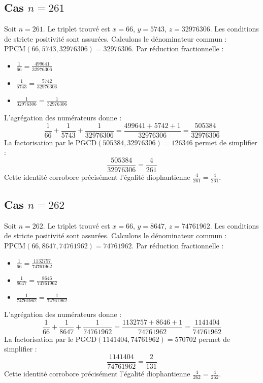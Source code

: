 \documentclass[11pt,a4paper]{article}
\begin{document}
\subsection{Cas $n = 261$}
Soit $n = 261$. Le triplet trouvé est $x = 66$, $y = 5743$, $z = 32976306$.
Les conditions de stricte positivité sont assurées.
Calculons le dénominateur commun : $\text{PPCM}(66, 5743, 32976306) = 32976306$.
Par réduction fractionnelle :
\begin{itemize}
    \item $\frac{1}{66} = \frac{499641}{32976306}$
    \item $\frac{1}{5743} = \frac{5742}{32976306}$
    \item $\frac{1}{32976306} = \frac{1}{32976306}$
\end{itemize}
L'agrégation des numérateurs donne :
$$ \frac{1}{66} + \frac{1}{5743} + \frac{1}{32976306} = \frac{499641 + 5742 + 1}{32976306} = \frac{505384}{32976306} $$
La factorisation par le $\text{PGCD}(505384, 32976306) = 126346$ permet de simplifier :
$$ \frac{505384}{32976306} = \frac{4}{261} $$
Cette identité corrobore précisément l'égalité diophantienne $\frac{4}{261} = \frac{4}{261}$.

\subsection{Cas $n = 262$}
Soit $n = 262$. Le triplet trouvé est $x = 66$, $y = 8647$, $z = 74761962$.
Les conditions de stricte positivité sont assurées.
Calculons le dénominateur commun : $\text{PPCM}(66, 8647, 74761962) = 74761962$.
Par réduction fractionnelle :
\begin{itemize}
    \item $\frac{1}{66} = \frac{1132757}{74761962}$
    \item $\frac{1}{8647} = \frac{8646}{74761962}$
    \item $\frac{1}{74761962} = \frac{1}{74761962}$
\end{itemize}
L'agrégation des numérateurs donne :
$$ \frac{1}{66} + \frac{1}{8647} + \frac{1}{74761962} = \frac{1132757 + 8646 + 1}{74761962} = \frac{1141404}{74761962} $$
La factorisation par le $\text{PGCD}(1141404, 74761962) = 570702$ permet de simplifier :
$$ \frac{1141404}{74761962} = \frac{2}{131} $$
Cette identité corrobore précisément l'égalité diophantienne $\frac{4}{262} = \frac{4}{262}$.
\end{document}
